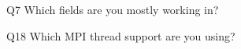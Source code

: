 \begin{description}%
\item{Q7} Which fields are you mostly working in?%
\item{Q18} Which MPI thread support are you using?%
\end{description}%
